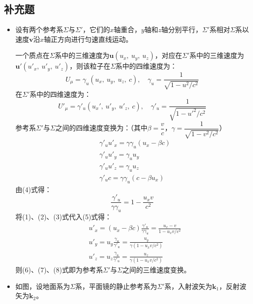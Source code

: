 \documentclass[a4paper,fontset=none]{ctexart}
\begin{document}
\subsection*{补充题}

\begin{itemize}

    \item[4.]
    \setcounter{equation}{0}
    设有两个参考系$\varSigma$与$\varSigma'$，它们的$x$轴重合，$y$轴和$z$轴分别平行，$\varSigma'$系相对$\varSigma$系以速度$\bm{v}$沿$x$轴正方向进行匀速直线运动。

    一个质点在$\varSigma$系中的三维速度为$\bm{u}(u_x,\ u_y,\ u_z)$，对应在$\varSigma'$系中的三维速度为$\bm{u}'(u'_x,\ u'_y,\ u'_z)$，则该粒子在$\varSigma$系中的四维速度为：
    \[
        U_\mu = \gamma_u(u_x,\ u_y,\ u_z,\ c),\quad \gamma_u = \frac{1}{\sqrt{1-u^2/c^2}}
    \]
    在$\varSigma'$系中的四维速度为：
    \[
        U'_\mu = \gamma'_u(u_x',\ u'_y,\ u'_z,\ c),\quad \gamma'_u = \frac{1}{\sqrt{1-{u'}^2/c^2}}
    \]
    参考系$\varSigma'$与$\varSigma$之间的四维速度变换为：（其中$\beta=\dfrac{v}{c}$，$\gamma=\dfrac{1}{\sqrt{1-v^2/c^2}}$）
    \begin{align}
        &\gamma'_u u'_x = \gamma\gamma_u(u_x - \beta c) \\
        &\gamma'_u u'_y = \gamma_u u_y \\
        &\gamma'_u u'_z = \gamma_u u_z \\
        &\gamma'_u c = \gamma \gamma_u(c - \beta u_x)
    \end{align}
    由(4)式得：
    \begin{equation}
        \frac{\gamma'_u}{\gamma\gamma_u} = 1 - \frac{u_x v}{c^2}
    \end{equation}
    将(1)、(2)、(3)式代入(5)式得：
    \begin{align}
        &u'_x = (u_x - \beta c)\frac{\gamma'_u}{\gamma\gamma_u} = \frac{u_x - v}{1 - u_x v/c^2} \\
        &u'_y = u_y\frac{\gamma_u}{\gamma'_u} = \frac{u_y}{\gamma(1-u_x v/c^2)} \\
        &u'_z = u_z\frac{\gamma_u}{\gamma'_u} = \frac{u_z}{\gamma(1-u_x v/c^2)}
    \end{align}
    则(6)、(7)、(8)式即为参考系$\varSigma'$与$\varSigma$之间的三维速度变换。

    \item[7.]
    如图，设地面系为$\varSigma$系，平面镜的静止参考系为$\varSigma'$系，入射波矢为$\bm{k}_1$，反射波矢为$\bm{k}_2$。


\end{itemize}
\end{document}
